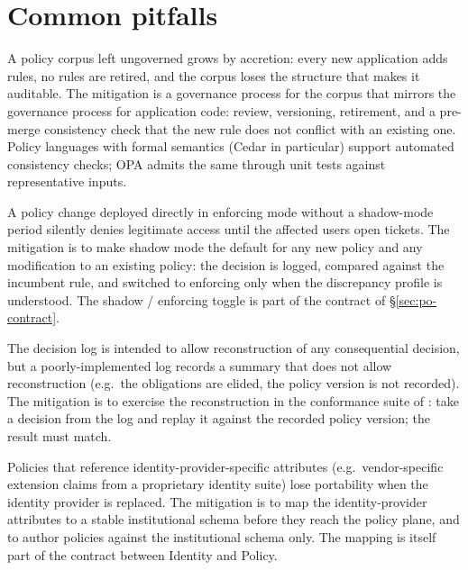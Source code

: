\section{Common pitfalls}
\label{sec:po-pitfalls}

\begin{pitfallbox}
\noindent A policy corpus left ungoverned grows by accretion: every
new application adds rules, no rules are retired, and the corpus
loses the structure that makes it auditable. The mitigation is a
governance process for the corpus that mirrors the governance process
for application code: review, versioning, retirement, and a
pre-merge consistency check that the new rule does not conflict with
an existing one. Policy languages with formal semantics (Cedar in
particular) support automated consistency checks; OPA admits the same
through unit tests against representative inputs.
\end{pitfallbox}

\begin{pitfallbox}
\noindent A policy change deployed directly in enforcing mode
without a shadow-mode period silently denies legitimate access until
the affected users open tickets. The mitigation is to make shadow
mode the default for any new policy and any modification to an
existing policy: the decision is logged, compared against the
incumbent rule, and switched to enforcing only when the discrepancy
profile is understood. The shadow / enforcing toggle is part of the
contract of \S\ref{sec:po-contract}.
\end{pitfallbox}

\begin{pitfallbox}
\noindent The decision log is intended to allow reconstruction of any
consequential decision, but a poorly-implemented log records a
summary that does not allow reconstruction (e.g.\ the obligations are
elided, the policy version is not recorded). The mitigation is to
exercise the reconstruction in the conformance suite of
: take a decision from the log and replay
it against the recorded policy version; the result must match.
\end{pitfallbox}

\begin{pitfallbox}
\noindent Policies that reference identity-provider-specific
attributes (e.g.\ vendor-specific extension claims from a
proprietary identity suite) lose portability
when the identity provider is replaced. The mitigation is to map the
identity-provider attributes to a stable institutional schema before
they reach the policy plane, and to author policies against the
institutional schema only. The mapping is itself part of the
contract between Identity and Policy.
\end{pitfallbox}

